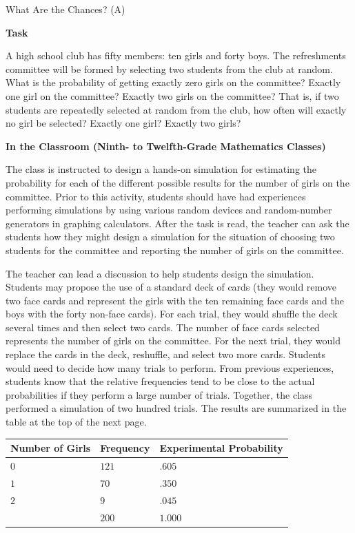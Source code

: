 \TriExample
  {
    What Are the Chances? (A)
  }
  {
    \textbf{Task}

    A high school club has fifty members: ten girls and forty boys. The refreshments committee will be formed by selecting two students from the club at random. What is the probability of getting exactly zero girls on the committee? Exactly one girl on the committee? Exactly two girls on the committee? That is, if two students are repeatedly selected at random from the club, how often will exactly no girl be selected? Exactly one girl? Exactly two girls?

    \textbf{In the Classroom (Ninth- to Twelfth-Grade Mathematics Classes)}

    The class is instructed to design a hands-on simulation for estimating the probability for each of the different possible results for the number of girls on the committee. Prior to this activity, students should have had experiences performing simulations by using various random devices and random-number generators in graphing calculators. After the task is read, the teacher can ask the students how they might design a simulation for the situation of choosing two students for the committee and reporting the number of girls on the committee.

    The teacher can lead a discussion to help students design the simulation. Students may propose the use of a standard deck of cards (they would remove two face cards and represent the girls with the ten remaining face cards and the boys with the forty non-face cards). For each trial, they would shuffle the deck several times and then select two cards. The number of face cards selected represents the number of girls on the committee. For the next trial, they would replace the cards in the deck, reshuffle, and select two more cards. Students would need to decide how many trials to perform. From previous experiences, students know that the relative frequencies tend to be close to the actual probabilities if they perform a large number of trials. Together, the class performed a simulation of two hundred trials. The results are summarized in the table at the top of the next page.

    \begin{center}
    \begin{tabular}{|
    >{\centering\arraybackslash}m{1.8cm}|
    >{\centering\arraybackslash}m{1.8cm}|
    >{\centering\arraybackslash}m{3.0cm}|}
    \hline
    Number of Girls & Frequency & Experimental Probability \\
    \hline
    $0$ & $121$ & $.605$ \\
    \hline
    $1$ & $70$  & $.350$ \\
    \hline
    $2$ & $9$   & $.045$ \\
    \hline
        & $200$ & $1.000$ \\
    \hline
    \end{tabular}
    \end{center}

}
